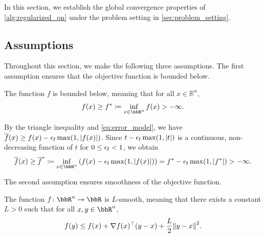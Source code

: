 \documentclass[journal_revised_MPC]{subfiles}
\begin{document}
In this section, we establish the global convergence properties of \cref{alg:regularized_qn} under the problem setting in \cref{sec:problem_setting}.

\subsection{Assumptions}\label{sec:assumptions}

Throughout this section, we make the following three assumptions.
The first assumption ensures that the objective function is bounded below.
\begin{assumption}\label{ass:bounded}
    The function $f$ is bounded below, meaning that for all $x \in \mathbb{R}^n$,
    \begin{equation*}
        f(x) \ge f^* \defeq \inf_{x \in \bbR^n} f(x) > -\infty .
    \end{equation*}
\end{assumption}
By the triangle inequality and \cref{eq:error_model}, we have
$\overline{f}(x) \ge f(x) - \epsilon_\mathrm{f} \max(1, \abs{f(x)})$.
Since $t - \epsilon_\mathrm{f} \max(1, \abs{t})$ is a continuous, non-decreasing function of $t$ for $0 \le \epsilon_\mathrm{f} < 1$, we obtain
\begin{equation*}
    \overline{f}(x) \ge
    \overline{f}^*
    \defeq \inf_{x \in \bbR^n} \qty( f(x) - \feps \max(1, \abs{f(x)}) )
    = f^* - \feps \max(1, \abs{f^*})
    > -\infty .
\end{equation*}

The second assumption ensures smoothness of the objective function.
\begin{assumption}\label{ass:LSmooth}
    The function $f \colon \bbR^n \to \bbR$ is $L$-smooth, meaning that there exists a constant $L > 0$ such that for all $x, y \in \bbR^n$,
    \begin{equation*}
        f(y) \le f(x) + \nabla f(x)^\top (y - x) + \frac{L}{2} \norm{y - x}^2.
    \end{equation*}
\end{assumption}
\end{document}
